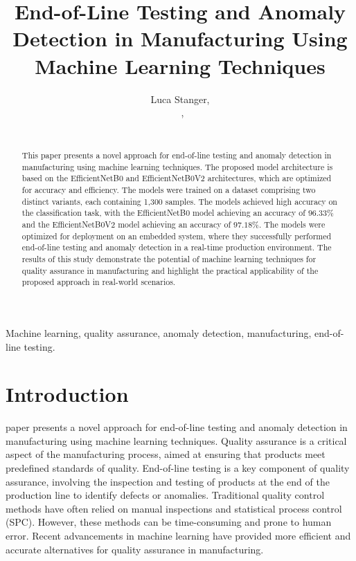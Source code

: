 \documentclass[lettersize,journal]{IEEEtran}
\begin{document}
\title{End-of-Line Testing and Anomaly Detection in Manufacturing Using Machine Learning Techniques}

\author{Luca Stanger,\\~,\\~%
}

\maketitle

\begin{abstract}
This paper presents a novel approach for end-of-line testing and anomaly detection in manufacturing using machine learning techniques. The proposed model architecture is based on the EfficientNetB0 and EfficientNetB0V2 architectures, which are optimized for accuracy and efficiency. The models were trained on a dataset comprising two distinct variants, each containing 1,300 samples. The models achieved high accuracy on the classification task, with the EfficientNetB0 model achieving an accuracy of $96.33\%$ and the EfficientNetB0V2 model achieving an accuracy of $97.18\%$. The models were optimized for deployment on an embedded system, where they successfully performed end-of-line testing and anomaly detection in a real-time production environment. The results of this study demonstrate the potential of machine learning techniques for quality assurance in manufacturing and highlight the practical applicability of the proposed approach in real-world scenarios.
\end{abstract}

\begin{IEEEkeywords}
Machine learning, quality assurance, anomaly detection, manufacturing, end-of-line testing.
\end{IEEEkeywords}

\section{Introduction}
 paper presents a novel approach for end-of-line testing and anomaly detection in manufacturing using machine learning techniques. Quality assurance is a critical aspect of the manufacturing process, aimed at ensuring that products meet predefined standards of quality. End-of-line testing is a key component of quality assurance, involving the inspection and testing of products at the end of the production line to identify defects or anomalies. Traditional quality control methods have often relied on manual inspections and statistical process control (SPC). However, these methods can be time-consuming and prone to human error. Recent advancements in machine learning have provided more efficient and accurate alternatives for quality assurance in manufacturing.
\end{document}
